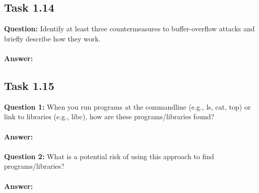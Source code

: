 \documentclass[11pt]{article}
\begin{document}
\subsection*{Task 1.14}

\textbf{Question: } Identify at least three countermeasures to buffer-overflow attacks and briefly describe how they work. \\\\
\textbf{Answer: }

\subsection*{Task 1.15}

\textbf{Question 1: } When you run programs at the commandline (e.g., ls, cat, top) or link to libraries (e.g., libc), how are these programs/libraries found? \\\\
\textbf{Answer: } \\\\
\textbf{Question 2: } What is a potential risk of using this approach to find programs/libraries? \\\\
\textbf{Answer: }
\end{document}
